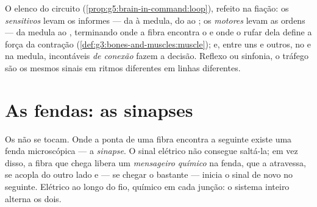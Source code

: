 \begin{example}\label{ex:g8:nervous-communication:lines}
O elenco do circuito (\cref{prop:g5:brain-in-command:loop}), refeito
na fiação: os \emph{ sensitivos} levam os informes --- da 
à medula, do  ao ; os \emph{ motores} levam as
ordens --- da medula ao , terminando onde a fibra encontra o
 e onde o rufar dela define a força da contração
(\cref{def:g3:bones-and-muscles:muscle}); e, entre uns e outros, no
 e na medula, incontáveis \emph{ de conexão} fazem a
decisão. Reflexo ou sinfonia, o tráfego são os mesmos sinais em ritmos
diferentes em linhas diferentes.
\end{example}

\section{As fendas: as sinapses}

\begin{definition}[A sinapse]\label{def:g8:nervous-communication:synapse}
Os  não se tocam. Onde a ponta de uma fibra encontra a 
seguinte existe uma fenda microscópica --- a
\emph{sinapse}. O sinal elétrico não consegue saltá-la;
em vez disso, a fibra que chega libera um \emph{mensageiro químico} na
fenda, que a atravessa, se acopla do outro lado e --- se chegar o
bastante --- inicia o sinal de novo no  seguinte. Elétrico ao
longo do fio, químico em cada junção: o sistema inteiro alterna os
dois.
\end{definition}

